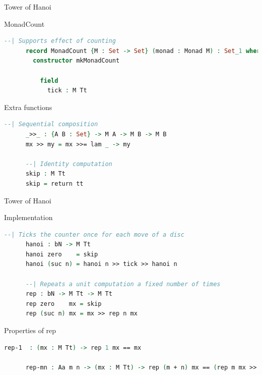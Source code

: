 \documentclass{beamer}
\begin{document}
\begin{frame}[fragile]{Tower of Hanoi}
  \begin{block}{MonadCount}
    \begin{lstlisting}[language=Agda, mathescape]
      --| Supports effect of counting
      record MonadCount {M : Set -> Set} (monad : Monad M) : Set_1 where
        constructor mkMonadCount

          field
            tick : M Tt
    \end{lstlisting}
  \end{block}

  \begin{block}{Extra functions}
    \begin{lstlisting}[language=Agda, mathescape]
      --| Sequential composition
      _>>_ : {A B : Set} -> M A -> M B -> M B
      mx >> my = mx >>= lam _ -> my

      --| Identity computation
      skip : M Tt
      skip = return tt
    \end{lstlisting}
  \end{block}
\end{frame}

\begin{frame}[fragile]{Tower of Hanoi}
  \begin{block}{Implementation}
    \begin{lstlisting}[language=Agda, mathescape]
      --| Ticks the counter once for each move of a disc
      hanoi : bN -> M Tt
      hanoi zero    = skip
      hanoi (suc n) = hanoi n >> tick >> hanoi n

      --| Repeats a unit computation a fixed number of times
      rep : bN -> M Tt -> M Tt
      rep zero    mx = skip
      rep (suc n) mx = mx >> rep n mx
    \end{lstlisting}
  \end{block}

  \begin{block}{Properties of rep}
    \begin{lstlisting}[language=Agda, mathescape]
      rep-1  : (mx : M Tt) -> rep 1 mx == mx

      rep-mn : Aa m n -> (mx : M Tt) -> rep (m + n) mx == (rep m mx >> rep n mx)
    \end{lstlisting}
  \end{block}
\end{frame}
\end{document}
